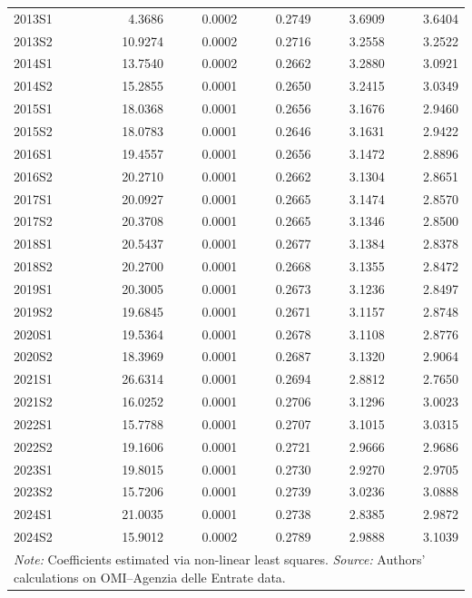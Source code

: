 \begin{landscape}
\begin{table}[!ht]
\begin{tabular}{lrrrrr}
    2013S1 &  4.3686 & 0.0002 & 0.2749 & 3.6909 & 3.6404 \\
    2013S2 & 10.9274 & 0.0002 & 0.2716 & 3.2558 & 3.2522 \\
    2014S1 & 13.7540 & 0.0002 & 0.2662 & 3.2880 & 3.0921 \\
    2014S2 & 15.2855 & 0.0001 & 0.2650 & 3.2415 & 3.0349 \\
    2015S1 & 18.0368 & 0.0001 & 0.2656 & 3.1676 & 2.9460 \\
    2015S2 & 18.0783 & 0.0001 & 0.2646 & 3.1631 & 2.9422 \\
    2016S1 & 19.4557 & 0.0001 & 0.2656 & 3.1472 & 2.8896 \\
    2016S2 & 20.2710 & 0.0001 & 0.2662 & 3.1304 & 2.8651 \\
    2017S1 & 20.0927 & 0.0001 & 0.2665 & 3.1474 & 2.8570 \\
    2017S2 & 20.3708 & 0.0001 & 0.2665 & 3.1346 & 2.8500 \\
    2018S1 & 20.5437 & 0.0001 & 0.2677 & 3.1384 & 2.8378 \\
    2018S2 & 20.2700 & 0.0001 & 0.2668 & 3.1355 & 2.8472 \\
    2019S1 & 20.3005 & 0.0001 & 0.2673 & 3.1236 & 2.8497 \\
    2019S2 & 19.6845 & 0.0001 & 0.2671 & 3.1157 & 2.8748 \\
    2020S1 & 19.5364 & 0.0001 & 0.2678 & 3.1108 & 2.8776 \\
    2020S2 & 18.3969 & 0.0001 & 0.2687 & 3.1320 & 2.9064 \\
    2021S1 & 26.6314 & 0.0001 & 0.2694 & 2.8812 & 2.7650 \\
    2021S2 & 16.0252 & 0.0001 & 0.2706 & 3.1296 & 3.0023 \\
    2022S1 & 15.7788 & 0.0001 & 0.2707 & 3.1015 & 3.0315 \\
    2022S2 & 19.1606 & 0.0001 & 0.2721 & 2.9666 & 2.9686 \\
    2023S1 & 19.8015 & 0.0001 & 0.2730 & 2.9270 & 2.9705 \\
    2023S2 & 15.7206 & 0.0001 & 0.2739 & 3.0236 & 3.0888 \\
    2024S1 & 21.0035 & 0.0001 & 0.2738 & 2.8385 & 2.9872 \\
    2024S2 & 15.9012 & 0.0002 & 0.2789 & 2.9888 & 3.1039 \\
    \hline
    \multicolumn{6}{l}{\textit{Note:} Coefficients estimated via non-linear least squares. \textit{Source:} Authors' calculations on OMI--Agenzia delle Entrate data.} \\
  \end{tabular}
\end{table}
\end{landscape}

